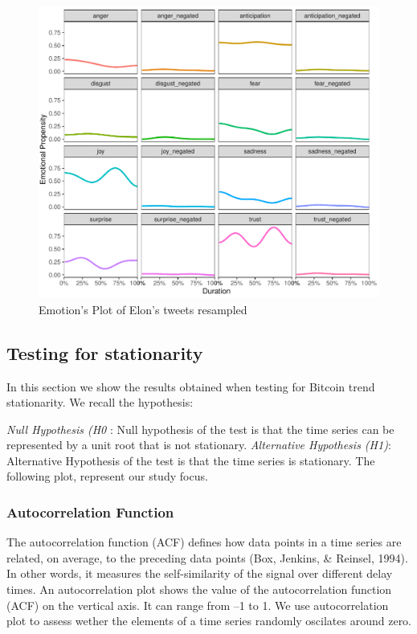 \documentclass[
]{article}
\begin{document}
\begin{figure}
\centering
\includegraphics{Trial1_files/figure-latex/fig13-1.pdf}
\caption{\label{fig:fig13}Emotion's Plot of Elon's tweets resampled}
\end{figure}

\hypertarget{testing-for-stationarity-1}{%
\subsection{Testing for stationarity}\label{testing-for-stationarity-1}}

In this section we show the results obtained when testing for Bitcoin
trend stationarity. We recall the hypothesis:

\emph{Null Hypothesis (H0} : Null hypothesis of the test is that the
time series can be represented by a unit root that is not stationary.
\emph{Alternative Hypothesis (H1)}: Alternative Hypothesis of the test
is that the time series is stationary. The following plot, represent our
study focus.

\hypertarget{autocorrelation-function}{%
\subsubsection{Autocorrelation
Function}\label{autocorrelation-function}}

The autocorrelation function (ACF) defines how data points in a time
series are related, on average, to the preceding data points (Box,
Jenkins, \& Reinsel, 1994). In other words, it measures the
self-similarity of the signal over different delay times. An
autocorrelation plot shows the value of the autocorrelation function
(ACF) on the vertical axis. It can range from --1 to 1. We use
autocorrelation plot to assess wether the elements of a time series
randomly oscilates around zero.
\end{document}
